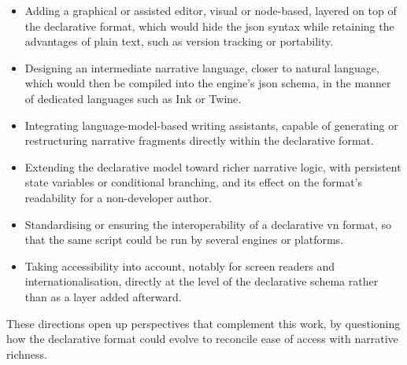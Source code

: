 \begin{itemize}
    \item Adding a graphical or assisted editor, visual or node-based, layered on top of the declarative format, which would hide the \gls{json} syntax while retaining the advantages of plain text, such as version tracking or portability.
    \item Designing an intermediate narrative language, closer to natural language, which would then be compiled into the engine's \gls{json} \gls{schema}, in the manner of dedicated languages such as Ink or Twine.
    \item Integrating language-model-based writing assistants, capable of generating or restructuring narrative fragments directly within the declarative format.
    \item Extending the declarative model toward richer narrative logic, with persistent state variables or conditional branching, and its effect on the format's readability for a non-developer author.
    \item Standardising or ensuring the interoperability of a declarative \gls{vn} format, so that the same script could be run by several engines or platforms.
    \item Taking accessibility into account, notably for screen readers and internationalisation, directly at the level of the declarative schema rather than as a layer added afterward.
\end{itemize}

These directions open up perspectives that complement this work, by questioning how the declarative format could evolve to reconcile ease of access with narrative richness.
